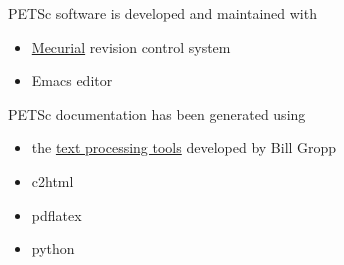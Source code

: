 PETSc software is developed and maintained with 
\begin{itemize}
\item \href{http://mercurial.selenic.com/}{Mecurial} revision control system
\item Emacs editor
\end{itemize}

PETSc documentation has been generated using
\begin{itemize}
\item the \href{http://www.cs.uiuc.edu/~wgropp/projects/software/sowing/index.htm}{text processing tools} developed by Bill Gropp
\item c2html
\item pdflatex
\item python
\end{itemize}

